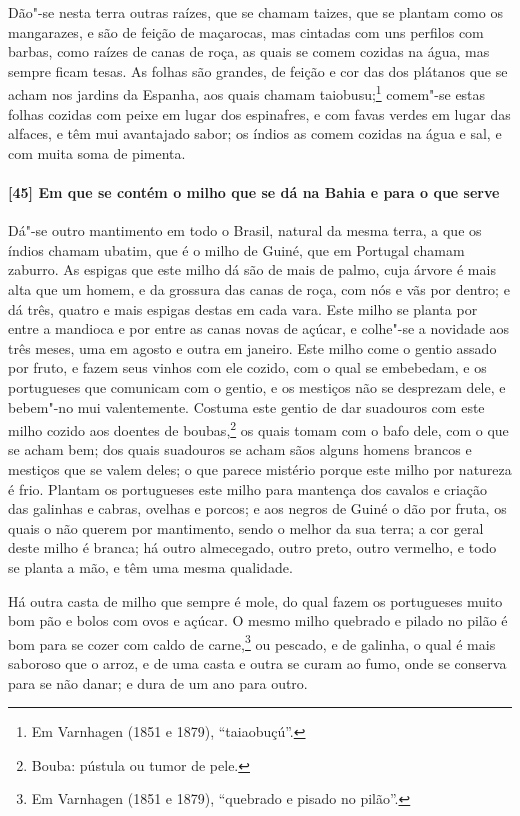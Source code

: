 Dão"-se nesta terra outras raízes, que se chamam taizes, que se 
plantam como os mangarazes, e são de feição de maçarocas, mas cintadas com uns
perfilos com barbas, como raízes de canas de roça, as quais se comem cozidas na água, mas
sempre ficam tesas. As folhas são grandes, de feição e cor das dos plátanos que se acham
nos jardins da Espanha, aos quais chamam taiobusu;\footnote{ Em Varnhagen (1851 e 1879),
``taiaobuçú''.} comem"-se estas folhas cozidas com peixe em lugar dos espinafres, e com
favas verdes em lugar das alfaces, e têm mui avantajado sabor; os índios as comem cozidas
na água e sal, e com muita soma de pimenta.

\paragraph{[45] Em que se contém o milho que se dá na Bahia e para o que serve}\quad
Dá"-se outro mantimento em todo o Brasil, natural da mesma terra, a que os índios chamam
ubatim, que é o milho de Guiné, que em Portugal chamam zaburro. As espigas que este milho
dá são de mais de palmo, cuja árvore é mais alta que um homem, e da grossura das canas de
roça, com nós e vãs por dentro; e dá três, quatro e mais espigas destas em cada vara. Este
milho se planta por entre a mandioca e por entre as canas novas de açúcar, e colhe"-se a
novidade aos três meses, uma em agosto e outra em janeiro. Este milho come o gentio assado
por fruto, e fazem seus vinhos com ele cozido, com o qual se embebedam, e os portugueses
que comunicam com o gentio, e os mestiços não se desprezam dele, e bebem"-no mui
valentemente. Costuma este gentio de dar suadouros com este milho cozido aos doentes de
boubas,\footnote{ Bouba: pústula ou tumor de
pele.} os quais tomam com o bafo dele, com o que se acham bem;
dos quais suadouros se acham sãos alguns homens brancos e mestiços que se valem deles; o
que parece mistério porque este milho por natureza é frio. Plantam os portugueses este
milho para mantença dos cavalos e criação das galinhas e cabras, ovelhas e porcos; e aos
negros de Guiné o dão por fruta, os quais o não querem por mantimento, sendo o melhor da
sua terra; a cor geral deste milho é branca; há outro almecegado, outro preto, outro
vermelho, e todo se planta a mão, e têm uma mesma qualidade.

Há outra casta de milho que sempre é mole, do qual fazem os portugueses muito bom pão e
bolos com ovos e açúcar. O mesmo milho quebrado e pilado no pilão é bom para se cozer com
caldo de carne,\footnote{ Em Varnhagen (1851 e 1879), ``quebrado e pisado no pilão''.} ou
pescado, e de galinha, o qual é mais saboroso que o arroz, e de uma casta e outra se curam
ao fumo, onde se conserva para se não danar; e dura de um ano para outro.

